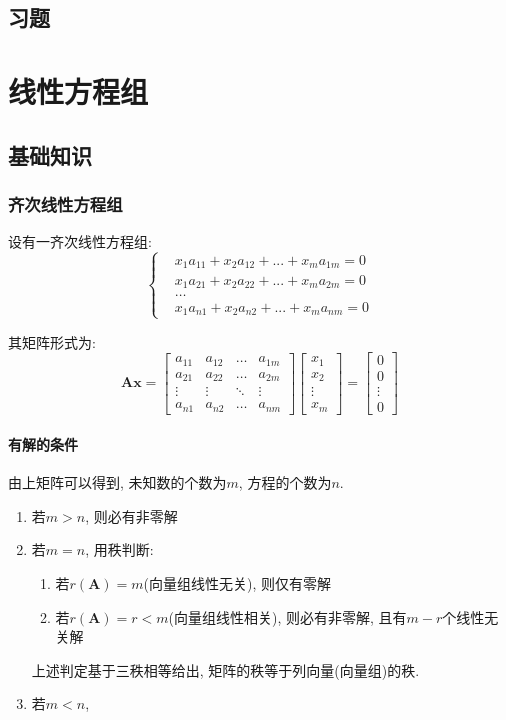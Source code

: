 \section{习题}
\chapter{线性方程组}
\section{基础知识}
\subsection{齐次线性方程组}
设有一齐次线性方程组:
\begin{equation*}
\left\{\begin{aligned}
& x_{1}a_{11}+x_{2}a_{12}+...+x_{m}a_{1m}=0 \\
& x_{1}a_{21}+x_{2}a_{22}+...+x_{m}a_{2m}=0 \\
& \dots \\
& x_{1}a_{n1}+x_{2}a_{n2}+...+x_{m}a_{nm}=0
\end{aligned}
\right.
\end{equation*}\par
其矩阵形式为:
\begin{equation*}
\bm{A}\bm{x}=\begin{bmatrix}
a_{11} & a_{12} & \dots & a_{1m} \\
a_{21} & a_{22} & \dots & a_{2m} \\
\vdots & \vdots & \ddots & \vdots \\
a_{n1} & a_{n2} & \dots & a_{nm}
\end{bmatrix}
\begin{bmatrix}
x_{1} \\
x_{2} \\
\vdots \\
x_{m}
\end{bmatrix}=
\begin{bmatrix}
0 \\
0 \\
\vdots \\
0
\end{bmatrix}
\end{equation*}
\subsubsection{有解的条件}
由上矩阵可以得到, 未知数的个数为$ m $, 方程的个数为$ n $.
\begin{enumerate}
\item 若$ m>n $, 则必有非零解
\item 若$ m=n $, 用秩判断:
\begin{enumerate}
\item 若$ r(\bm{A})=m $(向量组线性无关), 则仅有零解
\item 若$ r(\bm{A})=r<m $(向量组线性相关), 则必有非零解, 且有$ m-r $个线性无关解
\end{enumerate}
上述判定基于三秩相等给出, 矩阵的秩等于列向量(向量组)的秩.
\item 若$ m<n $, 
\end{enumerate}
